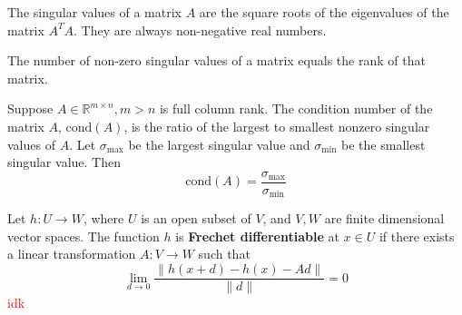 \begin{definition}
  The singular values of a matrix $A$ are the square roots of the eigenvalues of the matrix $A^TA$. They are always non-negative real numbers.

  The number of non-zero singular values of a matrix equals the rank of that matrix.
\end{definition}
\begin{definition}
  Suppose $A \in \mathbb R^{m \times n}, m > n$ is full column rank. The condition number of the matrix $A$, $\text{cond}(A)$, is the ratio of the largest to smallest nonzero singular values of $A$. Let $\sigma_{\max}$ be the largest singular value and $\sigma_{\min}$ be the smallest singular value. Then
  $$\text{cond}(A) = \frac{\sigma_{\max}}{\sigma_{\min}}$$
\end{definition}
\begin{definition}
  Let $h: U \to W$, where $U$ is an open subset of $V$, and $V,W$ are finite dimensional vector spaces. The function $h$ is \textbf{Frechet differentiable} at $x \in U$ if there exists a linear transformation $A: V \to W$ such that
  $$\lim_{d \rightarrow 0} \frac{\|h(x + d) - h(x) - Ad \|}{\|d\|} = 0$$
  \textcolor{red}{idk}
\end{definition}

